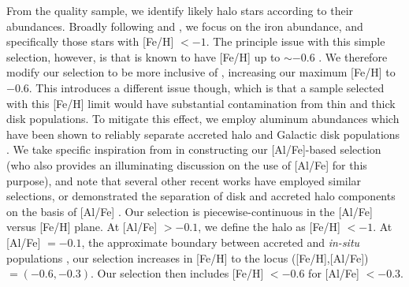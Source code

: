 From the quality sample, we identify likely halo stars according to their abundances. Broadly following \cite{mackereth20} and \cite{lane22}, we focus on the iron abundance, and specifically those stars with [Fe/H] $< -1$. The principle issue with this simple selection, however, is that \gse is known to have [Fe/H] up to $\sim -0.6$ \parencite[e.g.][]{myeong19,monty20,hasselquist21,horta23a}. We therefore modify our selection to be more inclusive of \gse, increasing our maximum [Fe/H] to $-0.6$. This introduces a different issue though, which is that a sample selected with this [Fe/H] limit would have substantial contamination from thin and thick disk populations. To mitigate this effect, we employ aluminum abundances which have been shown to reliably separate accreted halo and Galactic disk populations \parencite{hawkins15}. We take specific inspiration from \textcite{belokurov22} in constructing our [Al/Fe]-based selection (who also provides an illuminating discussion on the use of [Al/Fe] for this purpose), and note that several other recent works have employed similar selections, or demonstrated the separation of disk and accreted halo components on the basis of [Al/Fe] \parencite{das20,hasselquist21,horta23a}. Our selection is piecewise-continuous in the [Al/Fe] versus [Fe/H] plane. At [Al/Fe] $> -0.1$, we define the halo as [Fe/H] $< -1$. At [Al/Fe] $= -0.1$, the approximate boundary between accreted and \textit{in-situ} populations \parencite{hawkins15,das20,hasselquist21}, our selection increases in [Fe/H] to the locus ([Fe/H],[Al/Fe]) $= (-0.6,-0.3)$. Our selection then includes [Fe/H] $< -0.6$ for [Al/Fe] $< -0.3$.

